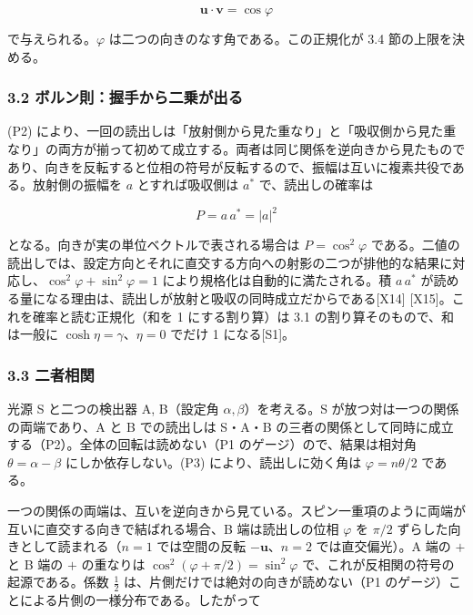\documentclass[
  a4paper,
]{ltjsarticle}
\begin{document}
\[
\boldsymbol{u}\cdot\boldsymbol{v}=\cos\varphi
\]

で与えられる。\(\varphi\) は二つの向きのなす角である。この正規化が 3.4
節の上限を決める。

\subsubsection{3.2
ボルン則：握手から二乗が出る}\label{ux30dcux30ebux30f3ux5247ux63e1ux624bux304bux3089ux4e8cux4e57ux304cux51faux308b}

(P2)
により、一回の読出しは「放射側から見た重なり」と「吸収側から見た重なり」の両方が揃って初めて成立する。両者は同じ関係を逆向きから見たものであり、向きを反転すると位相の符号が反転するので、振幅は互いに複素共役である。放射側の振幅を
\(a\) とすれば吸収側は \(a^{*}\) で、読出しの確率は

\[
P=a\,a^{*}=|a|^{2}
\]

となる。向きが実の単位ベクトルで表される場合は \(P=\cos^{2}\varphi\)
である。二値の読出しでは、設定方向とそれに直交する方向への射影の二つが排他的な結果に対応し、\(\cos^{2}\varphi+\sin^{2}\varphi=1\)
により規格化は自動的に満たされる。積 \(a\,a^{*}\)
が読める量になる理由は、読出しが放射と吸収の同時成立だからである{[}X14{]}
{[}X15{]}。これを確率と読む正規化（和を 1 にする割り算）は 3.1
の割り算そのもので、和は一般に \(\cosh\eta=\gamma\)、\(\eta=0\) でだけ 1
になる{[}S1{]}。

\subsubsection{3.3 二者相関}\label{ux4e8cux8005ux76f8ux95a2}

光源 S と二つの検出器 A, B（設定角 \(\alpha,\beta\)）を考える。S
が放つ対は一つの関係の両端であり、A と B での読出しは S・A・B
の三者の関係として同時に成立する（P2）。全体の回転は読めない（P1
のゲージ）ので、結果は相対角 \(\theta=\alpha-\beta\)
にしか依存しない。(P3) により、読出しに効く角は \(\varphi=n\theta/2\)
である。

一つの関係の両端は、互いを逆向きから見ている。スピン一重項のように両端が互いに直交する向きで結ばれる場合、B
端は読出しの位相 \(\varphi\) を \(\pi/2\)
ずらした向きとして読まれる（\(n=1\) では空間の反転
\(-\boldsymbol{u}\)、\(n=2\) では直交偏光）。A 端の \(+\) と B 端の
\(+\) の重なりは \(\cos^{2}(\varphi+\pi/2)=\sin^{2}\varphi\)
で、これが反相関の符号の起源である。係数 \(\tfrac12\)
は、片側だけでは絶対の向きが読めない（P1
のゲージ）ことによる片側の一様分布である。したがって
\end{document}
